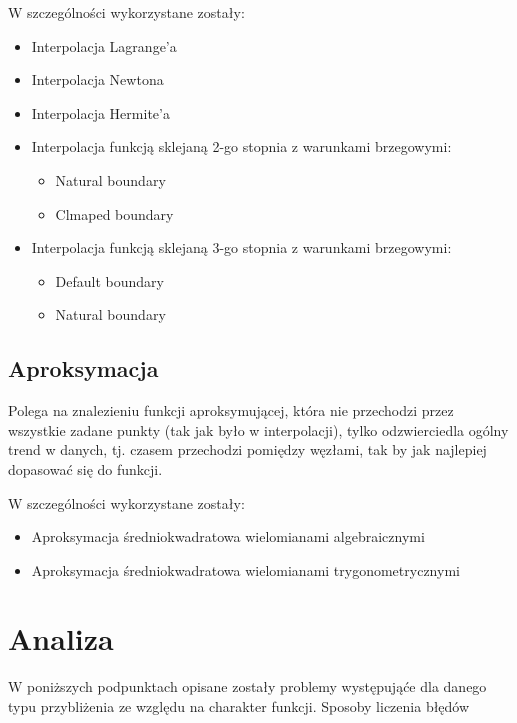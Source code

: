 \documentclass{article}
\begin{document}
\bigbreak

W szczególności wykorzystane zostały:

\begin{itemize}
    \item Interpolacja Lagrange'a
    \item Interpolacja Newtona
    \item Interpolacja Hermite'a
    \item Interpolacja funkcją sklejaną 2-go stopnia z warunkami brzegowymi:
    \begin{itemize}
        \item Natural boundary
        \item Clmaped boundary
    \end{itemize}
    \item Interpolacja funkcją sklejaną 3-go stopnia z warunkami brzegowymi:
    \begin{itemize}
        \item Default boundary
        \item Natural boundary
    \end{itemize}
\end{itemize}

\subsection{Aproksymacja}

Polega na znalezieniu funkcji aproksymującej, która nie przechodzi przez wszystkie zadane punkty (tak jak było w interpolacji), tylko odzwierciedla ogólny trend w danych, tj. czasem przechodzi pomiędzy węzłami, tak by jak najlepiej dopasować się do funkcji.

\bigbreak

W szczególności wykorzystane zostały:

\begin{itemize}
    \item Aproksymacja średniokwadratowa wielomianami algebraicznymi
    \item Aproksymacja średniokwadratowa wielomianami trygonometrycznymi
\end{itemize}

\section{Analiza}

W poniższych podpunktach opisane zostały problemy występująće dla danego typu przybliżenia ze względu na charakter funkcji.
\bigbreak
\noindent
Sposoby liczenia błędów
\end{document}
